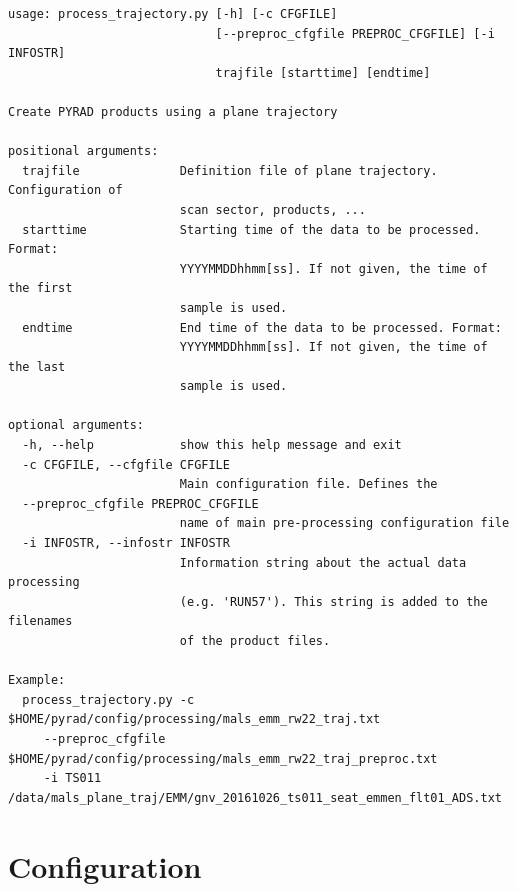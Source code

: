 \documentclass[a4paper,11pt,pdftex,twoside]{scrartcl}
\begin{document}
\begin{verbatim}
usage: process_trajectory.py [-h] [-c CFGFILE]
                             [--preproc_cfgfile PREPROC_CFGFILE] [-i INFOSTR]
                             trajfile [starttime] [endtime]

Create PYRAD products using a plane trajectory

positional arguments:
  trajfile              Definition file of plane trajectory. Configuration of
                        scan sector, products, ...
  starttime             Starting time of the data to be processed. Format:
                        YYYYMMDDhhmm[ss]. If not given, the time of the first
                        sample is used.
  endtime               End time of the data to be processed. Format:
                        YYYYMMDDhhmm[ss]. If not given, the time of the last
                        sample is used.

optional arguments:
  -h, --help            show this help message and exit
  -c CFGFILE, --cfgfile CFGFILE
                        Main configuration file. Defines the
  --preproc_cfgfile PREPROC_CFGFILE
                        name of main pre-processing configuration file
  -i INFOSTR, --infostr INFOSTR
                        Information string about the actual data processing
                        (e.g. 'RUN57'). This string is added to the filenames
                        of the product files.

Example:
  process_trajectory.py -c $HOME/pyrad/config/processing/mals_emm_rw22_traj.txt
     --preproc_cfgfile $HOME/pyrad/config/processing/mals_emm_rw22_traj_preproc.txt
     -i TS011 /data/mals_plane_traj/EMM/gnv_20161026_ts011_seat_emmen_flt01_ADS.txt

\end{verbatim}

\newpage
\section{Configuration}
\label{sec_configuration}
\end{document}
